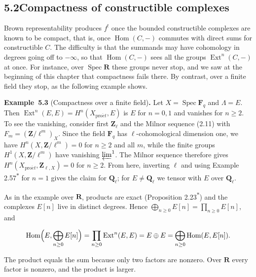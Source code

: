 \documentclass[11pt]{article}
\newenvironment{bpstatement}[2]{\par\addvspace{0.6\baselineskip}\noindent\textbf{#1}#2\textbf{.}\enspace\ignorespaces}
  {\par\addvspace{0.4\baselineskip}}
\newcommand{\bpout}[1]{#1\textsuperscript{\hyperlink{bp-outside}{\ensuremath{\ast}}}}
\providecommand{\Ext}{}\renewcommand{\Ext}{\operatorname{Ext}}
\providecommand{\Hom}{}\renewcommand{\Hom}{\operatorname{Hom}}
\begin{document}
\subsection*{\texorpdfstring{5.2\quad Compactness of constructible complexes}{5.2 Compactness of constructible complexes}}
\label{bp9}%
\label{bp10}%
Brown representability produces \(f^!\) once the bounded constructible complexes are known to be compact, that is, once \(\Hom(C,-)\) commutes with direct sums for constructible \(C\). The difficulty is that the summands may have cohomology in degrees going off to \(-\infty\), so that \(\Hom(C,-)\) sees all the groups \(\Ext^n(C,-)\) at once. For instance, over \(\operatorname{Spec}\mathbf R\) these groups never stop, and we saw at the beginning of this chapter that compactness fails there. By contrast, over a finite field they stop, as the following example shows.

\label{bp11}%
\begin{bpstatement}{Example~5.3}{ (Compactness over a finite field)}
Let \(X=\operatorname{Spec}\mathbf F_q\) and \(\Lambda=E\). Then \(\Ext^n(E,E)=H^n(X_{\mathrm{pro}\acute{e}t},E)\) is \(E\) for \(n=0,1\) and vanishes for \(n\geq2\). To see the vanishing, consider first \(\mathbf Z_\ell\) and the Milnor sequence (2.11) with \(F_m=(\mathbf Z/\ell^m)_X\). Since the field \(\mathbf F_q\) has \(\ell\)-cohomological dimension one, we have \(H^n(X,\mathbf Z/\ell^m)=0\) for \(n\ge2\) and all \(m\), while the finite groups \(H^1(X,\mathbf Z/\ell^m)\) have vanishing \(\varprojlim^1\). The Milnor sequence therefore gives \(H^n(X_{\mathrm{pro}\acute{e}t},\mathbf Z_{\ell,X})=0\) for \(n\geq2\). From here, inverting \(\ell\) and using Example \bpout{2.57} for \(n=1\) gives the claim for \(\mathbf Q_\ell\); for \(E\neq\mathbf Q_\ell\) we tensor with \(E\) over \(\mathbf Q_\ell\).

As in the example over \(\mathbf R\), products are exact (Proposition \bpout{2.23}) and the complexes \(E[n]\) live in distinct degrees. Hence \(\bigoplus_{n\ge0}E[n]=\prod_{n\ge0}E[n]\), and

\[
\Hom\Bigl(E,\bigoplus_{n\ge0}E[n]\Bigr)
=\prod_{n\ge0}\Ext^n(E,E)
=E\oplus E
=\bigoplus_{n\ge0}\Hom(E,E[n]).
\]

The product equals the sum because only two factors are nonzero. Over \(\mathbf R\) every factor is nonzero, and the product is larger.
\end{bpstatement}
\end{document}
